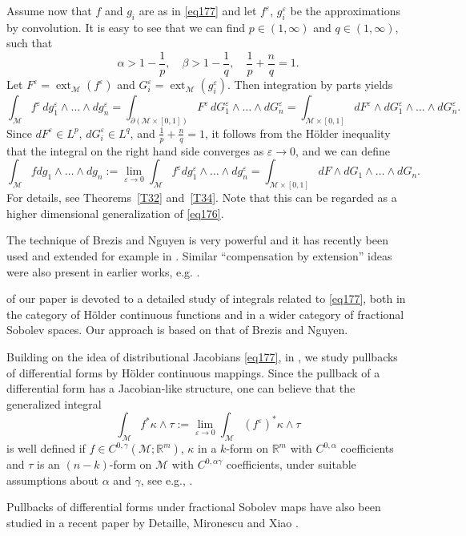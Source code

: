 \documentclass[intlimits,12pt,reqno]{amsart}
\newcommand{\cM}{\mathcal M}
\newcommand{\R}{\mathbb R}
\newcommand{\eps}{\varepsilon}
\numberwithin{equation}{section}
\def\ext{\operatorname{ext}}
\theoremstyle{definition}
\begin{document}
Assume now that $f$ and $g_i$ are as in \eqref{eq177} and let $f^\eps$, $g_i^\eps$ be the approximations by convolution. It is easy to see that we can find $p\in (1,\infty)$ and $q\in (1,\infty)$, such that
$$
\textstyle{\alpha>1-\frac{1}{p},
\quad
\beta>1-\frac{1}{q},
\quad
\frac{1}{p}+\frac{n}{q}=1}.
$$
Let $F^\eps=\ext_\cM (f^\eps)$ and $G_i^\eps=\ext_\cM (g_i^\eps)$. Then integration by parts yields
$$
\int_\cM f^\eps \, dg_1^\eps\wedge\ldots\wedge dg_n^\eps=
\int_{\partial(\cM\times [0,1])} F^\eps\, dG_1^\eps\wedge\ldots\wedge dG_n^\eps=
\int_{\cM\times [0,1]} dF^\eps \wedge dG_1^\eps\wedge\ldots\wedge dG_n^\eps.
$$
Since $dF^\eps\in L^p$, $dG_i^\eps\in L^q$, and $\frac{1}{p}+\frac{n}{q}=1$, it follows from the H\"older inequality 
that the integral on the right hand side converges as $\eps\to 0$, and we can define
$$
\int_\cM f dg_1\wedge\ldots\wedge dg_n:=\lim_{\eps\to 0}\int_\cM f^\eps dg_1^\eps\wedge\ldots\wedge dg_n^\eps
=
\int_{\cM\times [0,1]} dF \wedge dG_1\wedge\ldots \wedge dG_n.
$$
For details, see Theorems~\ref{T32} and~\ref{T34}. Note that this can be regarded as a higher dimensional generalization of \eqref{eq176}.

The technique of Brezis and Nguyen is very powerful and it has recently been used and extended for example in \cite{GladbachO,LS19,SVS}. Similar ``compensation by extension'' ideas were also present in earlier works, e.g. \cite{Chanillo01011991,CJS89}.

 of our paper is devoted to a detailed study of integrals related to \eqref{eq177}, both in the category of H\"older continuous functions and in a wider category of fractional Sobolev spaces.
Our approach is based on that of Brezis and Nguyen.


Building on the idea of distributional Jacobians \eqref{eq177}, in , we study pullbacks of differential forms by H\"older continuous mappings. Since the pullback of a differential form has a Jacobian-like structure, one can believe that 
the generalized integral
\begin{equation}
\label{eq175}
\int_{\cM} f^*\kappa\wedge\tau
:=
\lim_{\eps\to 0}
\int_{\cM} (f^\eps)^*\kappa\wedge\tau
\end{equation}
is well defined if $f\in C^{0,\gamma}(\cM;\R^m)$, $\kappa$ in a $k$-form on $\R^m$ with $C^{0,\alpha}$ coefficients and $\tau$ is an $(n-k)$-form on $\cM$ with $C^{0,\alpha\gamma}$ coefficients, under suitable assumptions about $\alpha$ and $\gamma$, see e.g., . 

Pullbacks of differential forms under fractional Sobolev maps have also been studied in a recent paper by Detaille, Mironescu and Xiao \cite{DMX}.
\end{document}
